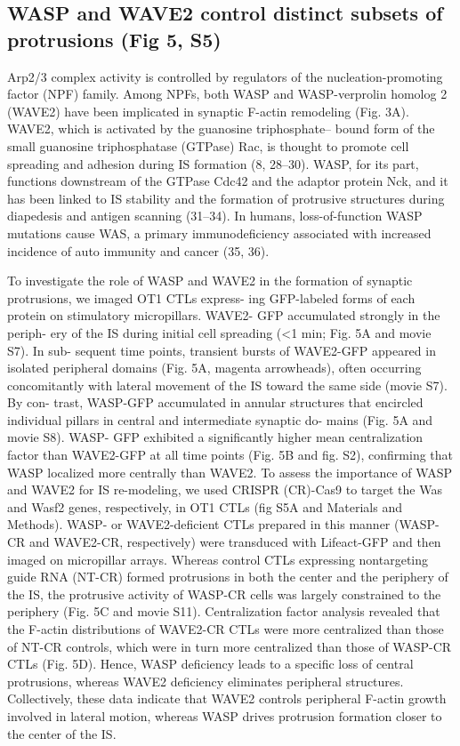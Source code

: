 \subsection{WASP and WAVE2 control distinct subsets of protrusions (Fig 5, S5)}
Arp2/3 complex activity is controlled by regulators of the nucleation-promoting factor (NPF) family. Among NPFs, both WASP and WASP-verprolin homolog 2 (WAVE2) have been implicated in synaptic F-actin remodeling (Fig. 3A). WAVE2, which is activated by the guanosine triphosphate– bound form of the small guanosine triphosphatase (GTPase) Rac, is thought to promote cell spreading and adhesion during IS formation (8, 28–30). WASP, for its part, functions downstream of the GTPase Cdc42 and the adaptor protein Nck, and it has been linked to IS stability and the formation of protrusive structures during diapedesis and antigen scanning (31–34). In humans, loss-of-function WASP mutations cause WAS, a primary immunodeficiency associated with increased incidence of auto immunity and cancer (35, 36).

To investigate the role of WASP and WAVE2 in the formation of synaptic protrusions, we imaged OT1 CTLs express- ing GFP-labeled forms of each protein on stimulatory micropillars. WAVE2- GFP accumulated strongly in the periph- ery of the IS during initial cell spreading (<1 min; Fig. 5A and movie S7). In sub- sequent time points, transient bursts of WAVE2-GFP appeared in isolated peripheral domains (Fig. 5A, magenta arrowheads), often occurring concomitantly with lateral movement of the IS toward the same side (movie S7). By con- trast, WASP-GFP accumulated in annular structures that encircled individual pillars in central and intermediate synaptic do- mains (Fig. 5A and movie S8). WASP- GFP exhibited a significantly higher mean centralization factor than WAVE2-GFP at all time points (Fig. 5B and fig. S2), confirming that WASP localized more centrally than WAVE2. To assess the importance of WASP and WAVE2 for IS re-modeling, we used CRISPR (CR)-Cas9 to target the Was and Wasf2 genes, respectively, in OT1 CTLs (fig S5A and Materials and Methods). WASP- or WAVE2-deficient CTLs prepared in this manner (WASP-CR and WAVE2-CR, respectively) were transduced with Lifeact-GFP and then imaged on micropillar arrays. Whereas control CTLs expressing nontargeting guide RNA (NT-CR) formed protrusions in both the center and the periphery of the IS, the protrusive activity of WASP-CR cells was largely constrained to the periphery (Fig. 5C and movie S11). Centralization factor analysis revealed that the F-actin distributions of WAVE2-CR CTLs were more centralized than those of NT-CR controls, which were in turn more centralized than those of WASP-CR CTLs (Fig. 5D). Hence, WASP deficiency leads to a specific loss of central protrusions, whereas WAVE2 deficiency eliminates peripheral structures. Collectively, these data indicate that WAVE2 controls peripheral F-actin growth involved in lateral motion, whereas WASP drives protrusion formation closer to the center of the IS.

